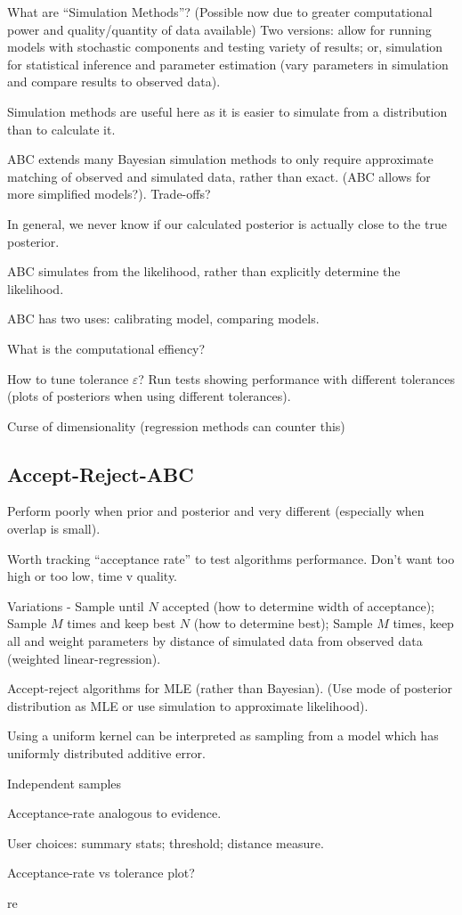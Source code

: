 \documentclass[11pt,a4paper,margin=0]{article}
\begin{document}
  \par What are ``Simulation Methods''?  (Possible now due to greater computational power and quality/quantity of data available) Two versions: allow for running models with stochastic components and testing variety of results; or, simulation for statistical inference and parameter estimation (vary parameters in simulation and compare results to observed data).
  \par Simulation methods are useful here as it is easier to simulate from a distribution than to calculate it.
  \par ABC extends many Bayesian simulation methods to only require approximate matching of observed and simulated data, rather than exact. (ABC allows for more simplified models?). Trade-offs?
  \par In general, we never know if our calculated posterior is actually close to the true posterior.
  \par ABC simulates from the likelihood, rather than explicitly determine the likelihood.
  \par ABC has two uses: calibrating model, comparing models.
  \par What is the computational effiency?
  \par How to tune tolerance $\varepsilon$? Run tests showing performance with different tolerances (plots of posteriors when using different tolerances).
  \par Curse of dimensionality (regression methods can counter this)

\subsection*{Accept-Reject-ABC}\label{sec_accept_reject_ABC}
  \par Perform poorly when prior and posterior and very different (especially when overlap is small).
  \par Worth tracking ``acceptance rate'' to test algorithms performance. Don't want too high or too low, time v quality.
  \par Variations - Sample until $N$ accepted (how to determine width of acceptance); Sample $M$ times and keep best $N$ (how to determine best); Sample $M$ times, keep all and weight parameters by distance of simulated data from observed data (weighted linear-regression).
  \par Accept-reject algorithms for MLE (rather than Bayesian). (Use mode of posterior distribution as MLE or use simulation to approximate likelihood).
  \par Using a uniform kernel can be interpreted as sampling from a model which has uniformly distributed additive error.
  \par Independent samples
  \par Acceptance-rate analogous to evidence.
  \par User choices: summary stats; threshold; distance measure.
  \par Acceptance-rate vs tolerance plot?
  \par re
\end{document}
